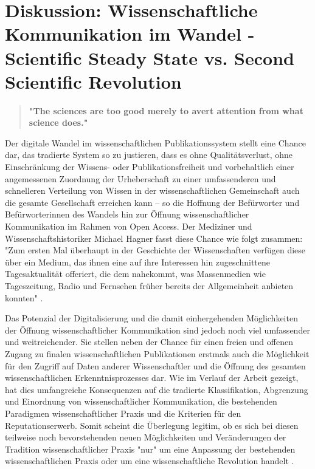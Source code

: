 \chapter{Diskussion: Wissenschaftliche Kommunikation im Wandel - Scientific Steady State vs. Second Scientific Revolution}

\begin{quote}
\textbf{"The sciences are too good merely to avert attention from what science does."}
\end{quote} \cite{Kittler_2004}

Der digitale Wandel im wissenschaftlichen Publikationssystem stellt eine Chance dar, das tradierte System so zu justieren, dass es ohne Qualitätsverlust, ohne Einschränkung der Wissens- oder Publikationsfreiheit und vorbehaltlich einer angemessenen Zuordnung der Urheberschaft zu einer umfassenderen und schnelleren Verteilung von Wissen in der wissenschaftlichen Gemeinschaft auch die gesamte Gesellschaft erreichen kann – so die Hoffnung der Befürworter und Befürworterinnen des Wandels hin zur Öffnung wissenschaftlicher Kommunikation im Rahmen von Open Access. Der Mediziner und Wissenschaftshistoriker Michael Hagner fasst diese Chance wie folgt zusammen: "Zum ersten Mal überhaupt in der Geschichte der Wissenschaften verfügen diese über ein Medium, das ihnen eine auf ihre Interessen hin zugeschnittene Tagesaktualität offeriert, die dem nahekommt, was Massenmedien wie Tageszeitung, Radio und Fernsehen früher bereits der Allgemeinheit anbieten konnten" \cite{Hagner_2015}.

Das Potenzial der Digitalisierung und die damit einhergehenden Möglichkeiten der Öffnung wissenschaftlicher Kommunikation sind jedoch noch viel umfassender und weitreichender. Sie stellen neben der Chance für einen freien und offenen Zugang zu finalen wissenschaftlichen Publikationen erstmals auch die Möglichkeit für den Zugriff auf Daten anderer Wissenschaftler und die Öffnung des gesamten wissenschaftlichen Erkenntnisprozesses dar. Wie im Verlauf der Arbeit gezeigt, hat dies umfangreiche Konsequenzen auf die tradierte Klassifikation, Abgrenzung und Einordnung von wissenschaftlicher Kommunikation, die bestehenden Paradigmen wissenschaftlicher Praxis und die Kriterien für den Reputationserwerb. Somit scheint die Überlegung legitim, ob es sich bei diesen teilweise noch bevorstehenden neuen Möglichkeiten und Veränderungen der Tradition wissenschaftlicher Praxis "nur" um eine Anpassung der bestehenden wissenschaftlichen Praxis oder um eine wissenschaftliche Revolution handelt \cite{Kuhn_2012}.

